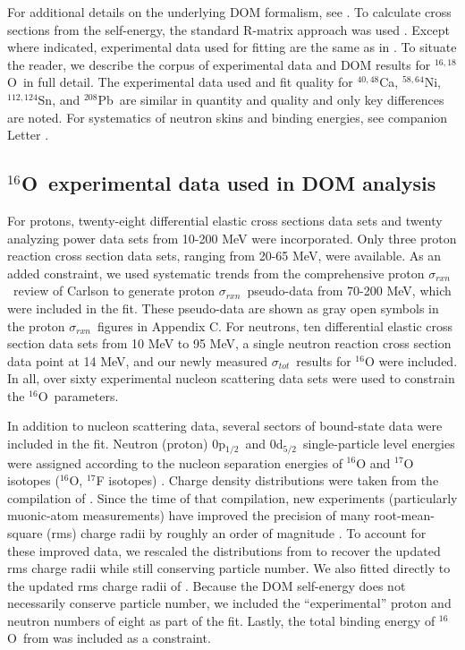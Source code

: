 \documentclass[twocolumn,secnumarabic,amssymb, nobibnotes, aps, prl,
superscriptaddress, nobalancelastpage, floatfix]{revtex4}
\newcommand{\tot}{\ensuremath{\sigma_{tot}}}
\newcommand{\rxn}{\ensuremath{\sigma_{rxn}}}
\newcommand{\oSix}{\ensuremath{^{16}}O}
\newcommand{\oSixEight}{\ensuremath{^{16,18}}O}
\newcommand{\caAughtEight}{\ensuremath{^{40,48}}C\lowercase{a}}
\newcommand{\niEightFour}{\ensuremath{^{58,64}}N\lowercase{i}}
\newcommand{\snTwelveFour}{\ensuremath{^{112,124}}S\lowercase{n}}
\newcommand{\pbEight}{\ensuremath{^{208}}P\lowercase{b}}
\newcommand{\pOne}{p\ensuremath{_{1/2}}}
\newcommand{\dFive}{d\ensuremath{_{5/2}}}
\begin{document}
For additional details on the underlying DOM formalism, see \cite{Mahaux1991,
Dickhoff2018}. To calculate cross sections from the self-energy,
the standard R-matrix approach was used \cite{LaneThomas}. Except where indicated, experimental data used for
fitting are the same as in \cite{PruittPhDThesis}. To situate the reader, we describe the
corpus of experimental data and DOM results for \oSixEight\ in full detail. The
experimental data used and fit quality for \caAughtEight, \niEightFour,
\snTwelveFour, and \pbEight\ are similar in quantity and quality and only key differences are noted. For
systematics of neutron skins and binding energies, see companion Letter \cite{Pruitt2020PRL}.

\subsection{\oSix\ experimental data used in DOM analysis} \label{o16Results}
For protons, twenty-eight differential elastic cross
sections data sets and twenty analyzing power data sets from 10-200 MeV were
incorporated. Only three proton reaction cross section data sets, ranging from 20-65 MeV,
were available. As an added constraint, we used systematic trends
from the comprehensive proton \rxn\ review of Carlson \cite{Carlson1996} to generate proton
\rxn\ pseudo-data from 70-200 MeV, which were included in the fit.
These pseudo-data are shown as gray open symbols in the proton \rxn\ figures in
Appendix C. For neutrons, ten differential elastic cross section
data sets from 10 MeV to 95 MeV, a single
neutron reaction cross section data point at 14 MeV, and our newly measured \tot\ results
for $^{16}$O were included. In all, over sixty experimental nucleon scattering
data sets were used to constrain the \oSix\ parameters.

In addition to nucleon scattering data, several sectors of bound-state data were
included in the fit. Neutron (proton) 0\pOne\ and 0\dFive\
single-particle level energies were
assigned according to the nucleon separation energies of $^{16}$O and
$^{17}$O isotopes ($^{16}$O, $^{17}$F isotopes) \cite{AME2016}.
Charge density distributions were taken from the compilation of \cite{DeVries1987}.
Since the time of that compilation,
new experiments (particularly muonic-atom measurements) have improved the precision
of many root-mean-square (rms) charge radii by roughly an order of magnitude \cite{Angeli2013}.
To account for these improved data, we rescaled the distributions from
\cite{DeVries1987} to recover the updated
rms charge radii while still conserving particle number. We also fitted directly
to the updated rms charge radii of \cite{Angeli2013}.
Because the DOM self-energy does not necessarily conserve particle number, we
included the ``experimental'' proton and neutron numbers of eight as part of the
fit. Lastly, the total binding energy of \oSix\ from \cite{AME2016} was
included as a constraint. 
\end{document}
